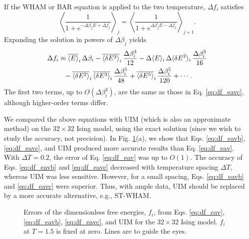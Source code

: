 \documentclass[reprint,aip,jcp,superscriptaddress]{revtex4-1}
\begin{document}
If the WHAM or BAR equation
is applied to the two temperature,
$\Delta f_i$ satisfies
%
\begin{equation*}
\left\langle
\frac{ 1 }
{ 1 + e^{-\Delta \beta_j E + \Delta f_j} }
\right\rangle_j
=
\left\langle
\frac{ 1 }
{ 1 + e^{\Delta \beta_j E - \Delta f_j} }
\right\rangle_{j+1}.
\end{equation*}
%
Expanding the solution
in powers of $\Delta \beta_j$
yields
\begin{align}
\Delta f_i
&
\approx
\overline{ \langle E \rangle }_i \, \Delta \beta_i
%
-\overline{ \langle \delta E^3 \rangle }_i
\, \frac{ \Delta \beta_i^3 } { 12 }
%
-\Delta \langle E \rangle_i
\, \Delta \langle \delta E^2 \rangle_i
\, \frac{ \Delta \beta_i^3 } { 16 }
\notag \\
&
\phantom{\approx}
%
-\overline{ \langle \delta E^2 \rangle }_i
\, \overline{ \langle \delta E^3 \rangle }_i
\, \frac{ \Delta \beta_i^5 } { 48 }
%
+\overline{ \langle \delta E^5 \rangle }_i
\, \frac{ \Delta \beta_i^5 } { 120 }
+ \cdots.
\notag
\end{align}
%
The first two terms, up to $O(\Delta \beta_i^3)$,
are the same as those in Eq. \eqref{eq:df_eavc},
although higher-order terms differ.



We compared the above equations
with UIM\cite{kastner2005}
(which is also an approximate method)
on the $32\times 32$ Ising model,
%
using the exact solution\cite{
ferdinand1969}
(since we wish to study
the accuracy, not precision).
%
In Fig. \ref{fig:is2approx}(a),
we show that
Eqs. \eqref{eq:df_eavb},
\eqref{eq:df_eavc},
and UIM
produced more accurate results than
Eq. \eqref{eq:df_eav}.
%
With $\Delta T = 0.2$,
the error of Eq. \eqref{eq:df_eav}
was up to $O(1)$.
%
The accuracy of
Eqs. \eqref{eq:df_eavb} and \eqref{eq:df_eavc}
decreased with temperature spacing $\Delta T$,
whereas
UIM was less sensitive.
%
However, for a small spacing,
Eqs. \eqref{eq:df_eavb} and \eqref{eq:df_eavc}
were superior.
%
Thus, with ample data,
UIM should be replaced
by a more accurate alternative, e.g., ST-WHAM.



\begin{figure}[h]
  \caption{
    \label{fig:is2approx}
    Errors of the dimensionless free energies, $f_i$,
    from Eqs. \eqref{eq:df_eav}, \eqref{eq:df_eavb}, \eqref{eq:df_eavc},
    and UIM for the $32\times 32$ Ising model.
    $f_i$ at $T = 1.5$ is fixed at zero.
    Lines are to guide the eyes.
  }
\end{figure}
\end{document}

